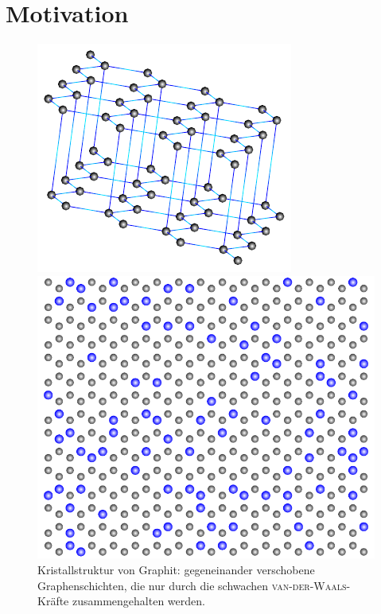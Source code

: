 \documentclass[a4paper, 10pt, twoside, openany]{book} %
\makeatletter
\def \mainmatter {\clearpage \@mainmattertrue \pagenumbering{arabic}}
\makeatother
\begin{document}
	\restoregeometry
	
	\mainmatter
	
	\chapter{Motivation}
	
	\begin{figure}[t]
		\begin{minipage}[b]{0.46\textwidth}
			\includegraphics[width=\textwidth]{Abbildungen/Raumstrukturen/Graphit.pdf}
			\caption[Kristallstruktur von Graphit]{Kristallstruktur von Graphit: gegeneinander verschobene Graphenschichten, die nur durch die schwachen \textsc{van-der-Waals}-Kräfte zusammengehalten werden. \cite{Rozplocha}}
			\label{Graphit}
		\end{minipage}
		\hfill
		\begin{minipage}[b]{0.5\textwidth}
			\includegraphics[width=\textwidth]{Abbildungen/random20.pdf}

\end{minipage}
\end{figure}
\end{document}
